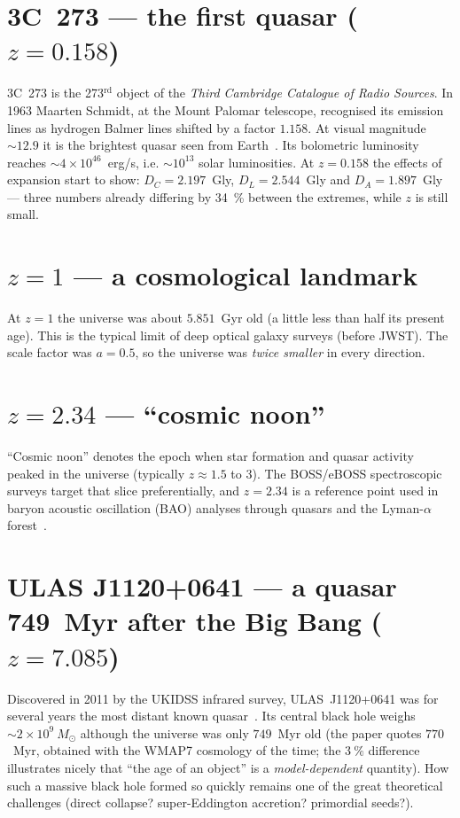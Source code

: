 \documentclass[11pt,a4paper,openany]{report}
\begin{document}
\section{3C~273 --- the first quasar ($z = 0.158$)}

3C~273 is the 273$^{\text{rd}}$ object of the \emph{Third Cambridge Catalogue of
Radio Sources}. In 1963 Maarten Schmidt, at the Mount Palomar telescope,
recognised its emission lines as hydrogen Balmer lines shifted by a factor
$1.158$. At visual magnitude $\sim 12.9$ it is the brightest quasar seen from
Earth~\cite{Schmidt1963}. Its bolometric luminosity reaches
$\sim 4\times 10^{46}$~erg/s, i.e. $\sim 10^{13}$ solar luminosities. At
$z=0.158$ the effects of expansion start to show: $D_{C} = 2.197$~Gly,
$D_{L} = 2.544$~Gly and $D_{A} = 1.897$~Gly --- three numbers already differing
by 34~\% between the extremes, while $z$ is still small.

\section{$z = 1$ --- a cosmological landmark}

At $z=1$ the universe was about $5.851$~Gyr old (a little less than half its
present age). This is the typical limit of deep optical galaxy surveys (before
JWST). The scale factor was $a = 0.5$, so the universe was \emph{twice
smaller} in every direction.

\section{$z = 2.34$ --- “cosmic noon”}

“Cosmic noon” denotes the epoch when star formation and quasar activity
peaked in the universe (typically $z \approx 1.5$ to $3$). The BOSS/eBOSS
spectroscopic surveys target that slice preferentially, and $z=2.34$ is a
reference point used in baryon acoustic oscillation (BAO) analyses through
quasars and the Lyman-$\alpha$ forest~\cite{Bautista2017}.

\section{ULAS J1120+0641 --- a quasar 749~Myr after the Big Bang ($z = 7.085$)}

Discovered in 2011 by the UKIDSS infrared survey, ULAS~J1120+0641 was for
several years the most distant known quasar~\cite{Mortlock2011}. Its central
black hole weighs $\sim 2\times 10^{9}~M_{\odot}$ although the universe was
only $749$~Myr old (the paper quotes $770$~Myr, obtained with the WMAP7
cosmology of the time; the $3~\%$ difference illustrates nicely that “the age
of an object” is a \emph{model-dependent} quantity). How such a massive black
hole formed so quickly remains one of the great theoretical challenges (direct
collapse? super-Eddington accretion? primordial seeds?).
\end{document}
